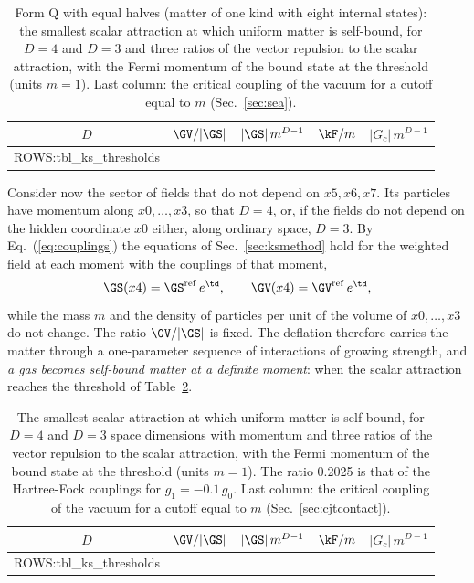 \begin{table}
\caption{\label{tab:ksthrq}Form Q with equal halves (matter of one kind with eight internal states):
the smallest scalar attraction at which uniform matter is self-bound, for $D=4$ and $D=3$ and three
ratios of the vector repulsion to the scalar attraction, with the Fermi momentum of the bound state
at the threshold (units $m=1$). Last column: the critical coupling of the vacuum for a cutoff equal
to $m$ (Sec.~\ref{sec:sea}).}
\begin{ruledtabular}
\begin{tabular}{ccccc}
$D$ & $\GV/|\GS|$ & $|\GS|\,m^{D-1}$ & $\kF/m$ & $|G_c|\,m^{D-1}$ \\
\hline
{{ROWS:tbl_ks_thresholds}}
\end{tabular}
\end{ruledtabular}
\end{table}
Consider now the sector of fields that do not depend on $x5,x6,x7$. Its particles have momentum
along $x0,\dots,x3$, so that $D=4$, or, if the fields do not depend on the hidden coordinate $x0$
either, along ordinary space, $D=3$.
By Eq.~(\ref{eq:couplings}) the equations of Sec.~\ref{sec:ksmethod} hold for the weighted field at
each moment with the couplings of that moment,
\begin{equation}
\GS(x4)=\GS^{\mathrm{ref}}\,e^{\td},\qquad\GV(x4)=\GV^{\mathrm{ref}}\,e^{\td},
\end{equation}
while the mass $m$ and the density of particles per unit of the volume of $x0,\dots,x3$ do not
change. The ratio $\GV/|\GS|$ is fixed. The deflation therefore carries the matter through a
one-parameter sequence of interactions of growing strength, and \emph{a gas becomes self-bound
matter at a definite moment}: when the scalar attraction reaches the threshold of
Table~\ref{tab:ksthr}.

\begin{table}
\caption{\label{tab:ksthr}The smallest scalar attraction at which uniform matter is self-bound, for
$D=4$ and $D=3$ space dimensions with momentum and three ratios of the vector repulsion to the
scalar attraction, with the Fermi momentum of the bound state at the threshold (units $m=1$). The
ratio 0.2025 is that of the Hartree-Fock couplings for $g_1=-0.1\,g_0$. Last column: the critical
coupling of the vacuum for a cutoff equal to $m$ (Sec.~\ref{sec:cjtcontact}).}
\begin{ruledtabular}
\begin{tabular}{ccccc}
$D$ & $\GV/|\GS|$ & $|\GS|\,m^{D-1}$ & $\kF/m$ & $|G_c|\,m^{D-1}$ \\
\hline
{{ROWS:tbl_ks_thresholds}}
\end{tabular}
\end{ruledtabular}
\end{table}

